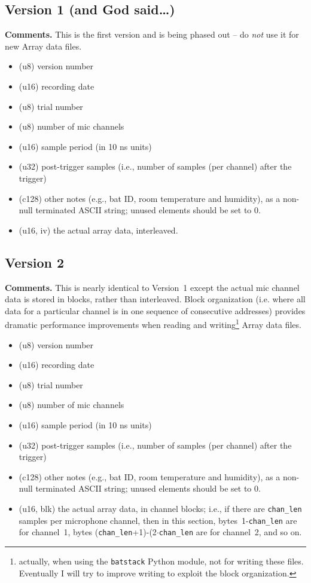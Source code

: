 \documentclass[letterpaper]{article}
\begin{document}
\subsection{Version 1 (and God said\ldots)}
\noindent \textbf{Comments.} This is the first version and is being
phased out -- do \textit{not} use it for new Array data files.
\begin{itemize}
\item[0] (u8) version number
\item[1-2] (u16) recording date
\item[3] (u8) trial number
\item[4] (u8) number of mic channels
\item[5-6] (u16) sample period (in 10 ns units)
\item[7-10] (u32) post-trigger samples (i.e., number of samples (per
  channel) after the trigger)
\item[11-138] (c128) other notes (e.g., bat ID, room temperature and
  humidity), as a non-null terminated ASCII string; unused elements
  should be set to $0$.
\item[139] (u16, iv) the actual array data, interleaved.
\end{itemize}

\subsection{Version 2}
\noindent \textbf{Comments.} This is nearly identical to Version~1
except the actual mic channel data is stored in blocks, rather than
interleaved. Block organization (i.e. where all data for a particular
channel is in one sequence of consecutive addresses) provides dramatic
performance improvements when reading and writing\footnote{actually,
  when using the \texttt{batstack} Python module, not for writing
  these files. Eventually I will try to improve writing to exploit the
  block organization.} Array data files.
\begin{itemize}
\item[0] (u8) version number
\item[1-2] (u16) recording date
\item[3] (u8) trial number
\item[4] (u8) number of mic channels
\item[5-6] (u16) sample period (in 10 ns units)
\item[7-10] (u32) post-trigger samples (i.e., number of samples (per
  channel) after the trigger)
\item[11-138] (c128) other notes (e.g., bat ID, room temperature and
  humidity), as a non-null terminated ASCII string; unused elements
  should be set to $0$.
\item[139] (u16, blk) the actual array data, in channel blocks; i.e.,
  if there are \texttt{chan\_len} samples per microphone channel, then
  in this section, bytes~1-\texttt{chan\_len} are for channel~1, bytes
  (\texttt{chan\_len}+1)-(2$\cdot$\texttt{chan\_len} are for
  channel~2, and so on.
\end{itemize}
\end{document}
